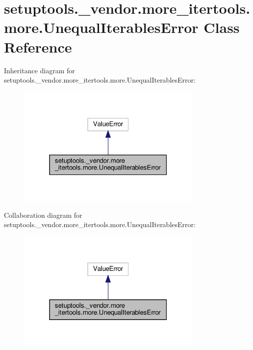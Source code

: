 \hypertarget{classsetuptools_1_1__vendor_1_1more__itertools_1_1more_1_1UnequalIterablesError}{}\section{setuptools.\+\_\+vendor.\+more\+\_\+itertools.\+more.\+Unequal\+Iterables\+Error Class Reference}
\label{classsetuptools_1_1__vendor_1_1more__itertools_1_1more_1_1UnequalIterablesError}


Inheritance diagram for setuptools.\+\_\+vendor.\+more\+\_\+itertools.\+more.\+Unequal\+Iterables\+Error\+:
\nopagebreak
\begin{figure}[H]
\begin{center}
\leavevmode
\includegraphics[width=259pt]{classsetuptools_1_1__vendor_1_1more__itertools_1_1more_1_1UnequalIterablesError__inherit__graph}
\end{center}
\end{figure}


Collaboration diagram for setuptools.\+\_\+vendor.\+more\+\_\+itertools.\+more.\+Unequal\+Iterables\+Error\+:
\nopagebreak
\begin{figure}[H]
\begin{center}
\leavevmode
\includegraphics[width=259pt]{classsetuptools_1_1__vendor_1_1more__itertools_1_1more_1_1UnequalIterablesError__coll__graph}
\end{center}
\end{figure}
